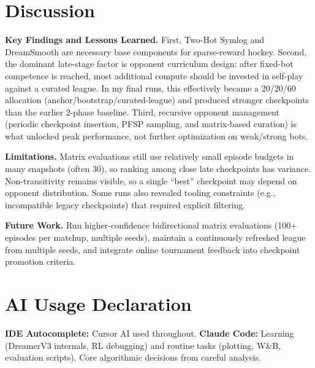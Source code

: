 \documentclass[11pt]{article}
\begin{document}
\section{Discussion}\label{sec:discussion}

\textbf{Key Findings and Lessons Learned.} First, Two-Hot Symlog and DreamSmooth are necessary base components for sparse-reward hockey. Second, the dominant late-stage factor is opponent curriculum design: after fixed-bot competence is reached, most additional compute should be invested in self-play against a curated league. In my final runs, this effectively became a 20/20/60 allocation (anchor/bootstrap/curated-league) and produced stronger checkpoints than the earlier 2-phase baseline. Third, recursive opponent management (periodic checkpoint insertion, PFSP sampling, and matrix-based curation) is what unlocked peak performance, not further optimization on weak/strong bots.

\textbf{Limitations.} Matrix evaluations still use relatively small episode budgets in many snapshots (often 30), so ranking among close late checkpoints has variance. Non-transitivity remains visible, so a single ``best'' checkpoint may depend on opponent distribution. Some runs also revealed tooling constraints (e.g., incompatible legacy checkpoints) that required explicit filtering.

\textbf{Future Work.} Run higher-confidence bidirectional matrix evaluations (100+ episodes per matchup, multiple seeds), maintain a continuously refreshed league from multiple seeds, and integrate online tournament feedback into checkpoint promotion criteria.

\section{AI Usage Declaration}\label{sec:ai-usage}

\textbf{IDE Autocomplete:} Cursor AI used throughout. \textbf{Claude Code:} Learning (DreamerV3 internals, RL debugging) and routine tasks (plotting, W\&B, evaluation scripts). Core algorithmic decisions from careful analysis.



\end{document}
